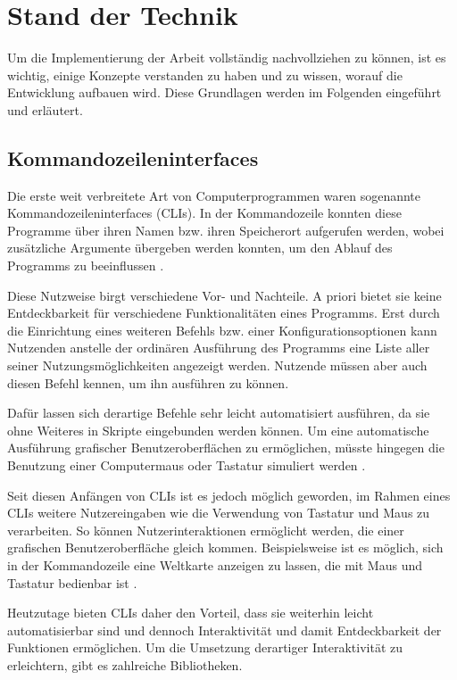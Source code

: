 \section{Stand der Technik}
Um die Implementierung der Arbeit vollständig nachvollziehen zu können, ist es wichtig, einige Konzepte verstanden zu haben und zu wissen, worauf die Entwicklung aufbauen wird. Diese Grundlagen werden im Folgenden eingeführt und erläutert.

\subsection{Kommandozeileninterfaces}
Die erste weit verbreitete Art von Computerprogrammen waren sogenannte Kommandozeileninterfaces (\gls{CLI}s). In der Kommandozeile konnten diese Programme über ihren Namen bzw. ihren Speicherort aufgerufen werden, wobei zusätzliche Argumente übergeben werden konnten, um den Ablauf des Programms zu beeinflussen \cite{verma2013gracoli}.

Diese Nutzweise birgt verschiedene Vor- und Nachteile. A priori bietet sie keine Entdeckbarkeit für verschiedene Funktionalitäten eines Programms. Erst durch die Einrichtung eines weiteren Befehls bzw. einer Konfigurationsoptionen kann Nutzenden anstelle der ordinären Ausführung des Programms eine Liste aller seiner Nutzungsmöglichkeiten angezeigt werden. Nutzende müssen aber auch diesen Befehl kennen, um ihn ausführen zu können.

Dafür lassen sich derartige Befehle sehr leicht automatisiert ausführen, da sie ohne Weiteres in Skripte eingebunden werden können. Um eine automatische Ausführung grafischer Benutzeroberflächen zu ermöglichen, müsste hingegen die Benutzung einer Computermaus oder Tastatur simuliert werden \cite{fellmann2007command}.

Seit diesen Anfängen von \gls{CLI}s ist es jedoch möglich geworden, im Rahmen eines \gls{CLI}s weitere Nutzereingaben wie die Verwendung von Tastatur und Maus zu verarbeiten. So können Nutzerinteraktionen ermöglicht werden, die einer grafischen Benutzeroberfläche gleich kommen. Beispielsweise ist es möglich, sich in der Kommandozeile eine Weltkarte anzeigen zu lassen, die mit Maus und Tastatur bedienbar ist \cite{mapscii}.

Heutzutage bieten \gls{CLI}s daher den Vorteil, dass sie weiterhin leicht automatisierbar sind und dennoch Interaktivität und damit Entdeckbarkeit der Funktionen ermöglichen. Um die Umsetzung derartiger Interaktivität zu erleichtern, gibt es zahlreiche Bibliotheken.

